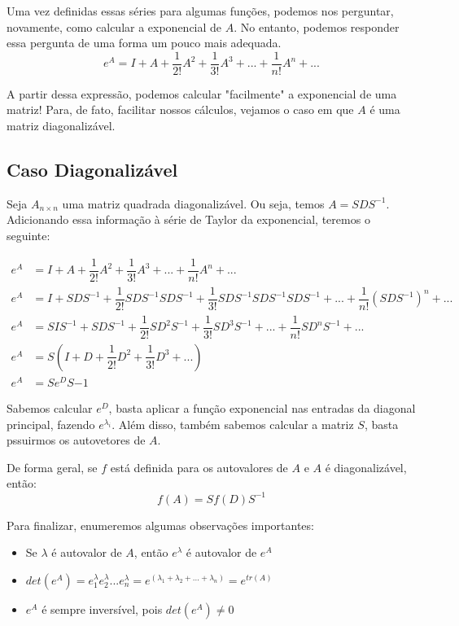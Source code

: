 \documentclass[12pt]{article}
\begin{document}
	Uma vez definidas essas séries para algumas funções, podemos nos perguntar, novamente, como calcular a exponencial de $A$. No entanto, podemos responder essa pergunta de uma forma um pouco mais adequada.
	\begin{equation*}
		e^A=I+A+\dfrac{1}{2!}A^2+\dfrac{1}{3!}A^3+...+\dfrac{1}{n!}A^n+...
	\end{equation*}
	
	A partir dessa expressão, podemos calcular "facilmente" a exponencial de uma matriz! Para, de fato, facilitar nossos cálculos, vejamos o caso em que $A$ é uma matriz diagonalizável.
	
	\subsection{Caso Diagonalizável}
	
	Seja $A_{n\times n}$ uma matriz quadrada diagonalizável. Ou seja, temos $A=SDS^{-1}$. Adicionando essa informação à série de Taylor da exponencial, teremos o seguinte:
	
	\begin{align*}
		e^A&=I+A+\dfrac{1}{2!}A^2+\dfrac{1}{3!}A^3+...+\dfrac{1}{n!}A^n+...\\
		e^A&=I+SDS^{-1}+\dfrac{1}{2!}SDS^{-1}SDS^{-1}+\dfrac{1}{3!}SDS^{-1}SDS^{-1}SDS^{-1}+...+\dfrac{1}{n!}(SDS^{-1})^n+...\\
		e^A&=SIS^{-1}+SDS^{-1}+\dfrac{1}{2!}SD^2S^{-1}+\dfrac{1}{3!}SD^3S^{-1}+...+\dfrac{1}{n!}SD^nS^{-1}+...\\
		e^A&=S(I+D+\dfrac{1}{2!}D^2+\dfrac{1}{3!}D^3+...)\\
		e^A&=Se^DS{-1}
	\end{align*}
	
	Sabemos calcular $e^D$, basta aplicar a função exponencial nas entradas da diagonal principal, fazendo $e^{\lambda_i}$. Além disso, também sabemos calcular a matriz $S$, basta pssuirmos os autovetores de $A$.
	
	De forma geral, se $f$ está definida para os autovalores de $A$ e $A$ é diagonalizável, então:
	\begin{equation*}
		f(A)=Sf(D)S^{-1}
	\end{equation*}
	
	Para finalizar, enumeremos algumas observações importantes:
	\begin{itemize}
		\item Se $\lambda$ é autovalor de $A$, então $e^\lambda$ é autovalor de $e^A$
		\item $det(e^A)=e^\lambda_1e^\lambda_2...e^\lambda_n=e^(\lambda_1+\lambda_2+...+\lambda_n)=e^{tr(A)}$
		\item $e^A$ é sempre inversível, pois $det(e^A)\neq 0$
	\end{itemize}
	
\end{document}

